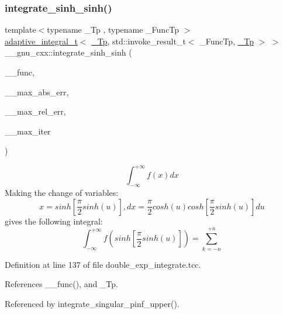 \subsubsection{\texorpdfstring{integrate\+\_\+sinh\+\_\+sinh()}{integrate\_sinh\_sinh()}}
{\footnotesize\ttfamily template$<$typename \+\_\+\+Tp , typename \+\_\+\+Func\+Tp $>$ \\
\hyperlink{struct____gnu__cxx_1_1adaptive__integral__t}{adaptive\+\_\+integral\+\_\+t}$<$ \hyperlink{namespace____gnu__cxx_a3b19a9c800ca194374ef9172290f7d79}{\+\_\+\+Tp}, std\+::invoke\+\_\+result\+\_\+t$<$ \+\_\+\+Func\+Tp, \hyperlink{namespace____gnu__cxx_a3b19a9c800ca194374ef9172290f7d79}{\+\_\+\+Tp} $>$ $>$ \+\_\+\+\_\+gnu\+\_\+cxx\+::integrate\+\_\+sinh\+\_\+sinh (\begin{DoxyParamCaption}\item[{\+\_\+\+Func\+Tp}]{\+\_\+\+\_\+func,  }\item[{\hyperlink{namespace____gnu__cxx_a3b19a9c800ca194374ef9172290f7d79}{\+\_\+\+Tp}}]{\+\_\+\+\_\+max\+\_\+abs\+\_\+err,  }\item[{\hyperlink{namespace____gnu__cxx_a3b19a9c800ca194374ef9172290f7d79}{\+\_\+\+Tp}}]{\+\_\+\+\_\+max\+\_\+rel\+\_\+err,  }\item[{int}]{\+\_\+\+\_\+max\+\_\+iter }\end{DoxyParamCaption})}

\[ \int_{-\infty}^{+\infty}f(x)dx \] Making the change of variables\+: \[ x = sinh\left[\frac{\pi}{2}sinh(u)\right], dx = \frac{\pi}{2} cosh(u) cosh\left[\frac{\pi}{2}sinh(u)\right]du \] gives the following integral\+: \[ \int_{-\infty}^{+\infty}f(sinh\left[\frac{\pi}{2}sinh(u)\right]) = \sum_{k=-n}^{+n} \] 

Definition at line 137 of file double\+\_\+exp\+\_\+integrate.\+tcc.



References \+\_\+\+\_\+func(), and \+\_\+\+Tp.



Referenced by integrate\+\_\+singular\+\_\+pinf\+\_\+upper().


